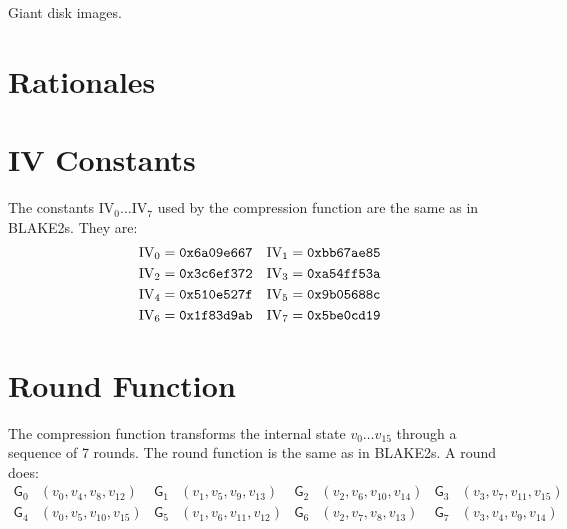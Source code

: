 \documentclass[11pt,notitlepage,a4paper]{article}
\newcommand{\GG}{\mathsf{G}}
\newcommand{\IV}{\text{IV}}
\begin{document}
  Giant disk images.

\section{Rationales}\label{sec:rationales}

\nocite{*}



\begin{appendices}

\section{IV Constants}\label{sec:ivconstants}

    The constants $\IV_0 \ldots \IV_7$ used by the compression function are the
    same as in BLAKE2s. They are:
\begin{align*}
    \IV_0 &= \text{\texttt{0x6a09e667}} &
    \IV_1 &= \text{\texttt{0xbb67ae85}} \\
    \IV_2 &= \text{\texttt{0x3c6ef372}} &
    \IV_3 &= \text{\texttt{0xa54ff53a}} \\
    \IV_4 &= \text{\texttt{0x510e527f}} &
    \IV_5 &= \text{\texttt{0x9b05688c}} \\
    \IV_6 &= \text{\texttt{0x1f83d9ab}} &
    \IV_7 &= \text{\texttt{0x5be0cd19}}
\end{align*}

\section{Round Function}\label{sec:roundfn}

    The compression function transforms the internal state $v_{0} \ldots
    v_{15}$ through a sequence of 7 rounds. The round function is the same as
    in BLAKE2s. A round does:
\begin{align*}
    \GG_{0}&(v_{0}, v_{4}, v_{8}, v_{12}) &
    \GG_{1}&(v_{1}, v_{5}, v_{9}, v_{13}) &
    \GG_{2}&(v_{2}, v_{6}, v_{10}, v_{14}) &
    \GG_{3}&(v_{3}, v_{7}, v_{11}, v_{15}) \\
    \GG_{4}&(v_{0}, v_{5}, v_{10}, v_{15}) &
    \GG_{5}&(v_{1}, v_{6}, v_{11}, v_{12}) &
    \GG_{6}&(v_{2}, v_{7}, v_{8}, v_{13}) &
    \GG_{7}&(v_{3}, v_{4}, v_{9}, v_{14})
\end{align*}


\end{appendices}
\end{document}
